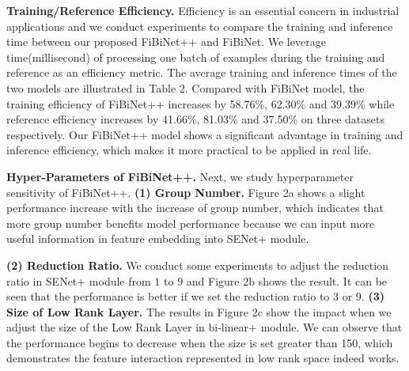 \documentclass[sigconf]{acmart}
\begin{document}
\textbf{Training/Reference Efficiency.} 
Efficiency is an essential concern in industrial applications and we conduct experiments to compare the training and inference time between our proposed FiBiNet++ and FiBiNet. We leverage time(millisecond) of processing one batch of examples during the training and reference as an efficiency metric. The average training and  inference times of the two models are illustrated in Table 2. Compared with FiBiNet model, the training efficiency of FiBiNet++ increases by 58.76\%, 62.30\% and 39.39\% while reference efficiency increases by 41.66\%, 81.03\% and 37.50\% on three datasets respectively. Our FiBiNet++ model shows a significant advantage in training and inference efficiency, which makes it more practical to be applied in real life. 


\textbf{Hyper-Parameters of FiBiNet++.} Next, we study hyperparameter sensitivity of FiBiNet++. 
\textbf{ (1) Group Number.}  Figure 2a shows a slight performance increase with the increase of group number, which indicates that more group number benefits model performance because we can input more useful information in feature embedding into SENet+ module.

\textbf{ (2) Reduction Ratio.} We conduct some experiments to adjust the reduction ratio in SENet+ module from $1$ to $9$ and Figure 2b shows the result. It can be seen that the performance is better if we set the reduction ratio  to 3 or 9.
\textbf{ (3) Size of Low Rank Layer.} The results in Figure 2c show the impact when we adjust the size of the Low Rank Layer in bi-linear+ module. We can observe that the performance begins to decrease when the size is set greater than 150, which demonstrates the feature interaction represented in low rank space indeed works.
\begin{table}
\centering
\caption{Training and reference efficiency comparison}
\label{tab:training}
\end{table}
\end{document}
